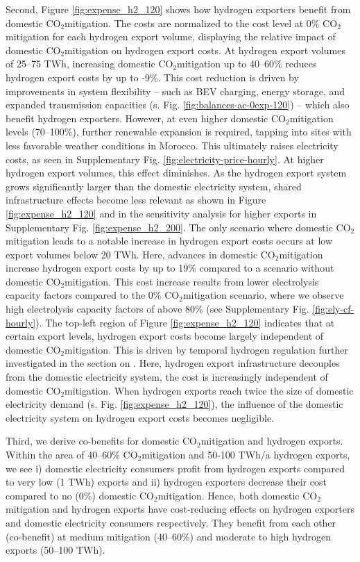 \documentclass[5p,numafflabel]{elsarticle}
\newcommand{\co}{\ce{CO2}~}
\def\co{CO${}_2${\:}}
\begin{document}
Second, Figure \ref{fig:expense_h2_120} shows how hydrogen exporters benefit from domestic \co mitigation.
The costs are normalized to the cost level at 0\% \co mitigation for each hydrogen export volume, displaying the relative impact of domestic \co mitigation on hydrogen export costs.
At hydrogen export volumes of 25--75 TWh, increasing domestic \co mitigation up to 40–60\% reduces hydrogen export costs by up to -9\%. 
This cost reduction is driven by improvements in system flexibility -- such as BEV charging, energy storage, and expanded transmission capacities (s. Fig. \ref{fig:balances-ac-0exp-120}) -- which also benefit hydrogen exporters.
However, at even higher domestic \co mitigation levels (70--100\%), further renewable expansion is required, tapping into sites with less favorable weather conditions in Morocco. This ultimately raises electricity costs, as seen in Supplementary Fig. \ref{fig:electricity-price-hourly}.
At higher hydrogen export volumes, this effect diminishes. As the hydrogen export system grows significantly larger than the domestic electricity system, shared infrastructure effects become less relevant 
as shown in Figure \ref{fig:expense_h2_120} and in the sensitivity analysis for higher exports in Supplementary Fig. \ref{fig:expense_h2_200}. 
The only scenario where domestic \co mitigation leads to a notable increase in hydrogen export costs occurs at low export volumes below 20 TWh. Here, advances in domestic \co mitigation increase hydrogen export costs by up to 19\% compared to a scenario without domestic \co mitigation. 
This cost increase results from lower electrolysis capacity factors compared to the 0\% \co mitigation scenario, where we observe high electrolysis capacity factors of above 80\% (see Supplementary Fig. \ref{fig:ely-cf-hourly}).
The top-left region of Figure \ref{fig:expense_h2_120} indicates that at certain export levels, hydrogen export costs become largely independent of domestic \co mitigation. This is driven by temporal hydrogen regulation further investigated in the section on . Here, hydrogen export infrastructure decouples from the domestic electricity system, the cost is increasingly independent of domestic \co mitigation.
When hydrogen exports reach twice the size of domestic electricity demand (s. Fig. \ref{fig:expense_h2_120}), the influence of the domestic electricity system on hydrogen export costs becomes negligible.


Third, we derive co-benefits for domestic \co mitigation and hydrogen exports. 
Within the area of 40--60\% \co mitigation and 50-100 TWh/a hydrogen exports, we see i) domestic electricity consumers profit from hydrogen exports compared to very low (1 TWh) exports and ii) hydrogen exporters decrease their cost compared to no (0\%) domestic \co mitigation. 
Hence, both domestic \co mitigation and hydrogen exports have cost-reducing effects on hydrogen exporters and domestic electricity consumers respectively. They benefit from each other (co-benefit) at medium mitigation (40--60\%) and moderate to high hydrogen exports (50--100 TWh). 
\end{document}
